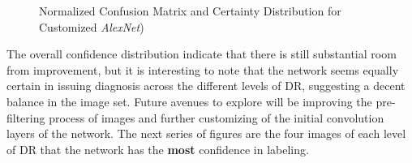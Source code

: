 \documentclass[letterpaper,12pt]{article}
\begin{document}
\begin{figure}[htbp]
\begin{center}
\caption{Normalized Confusion Matrix and Certainty Distribution for Customized \textit{AlexNet})}
\label{DR0_C}
\end{center}
\end{figure}

The overall confidence distribution indicate that there is still substantial room from improvement, but it is interesting to note that the network seems equally certain in issuing diagnosis across the different levels of DR, suggesting a decent balance in the image set. Future avenues to explore will be improving the pre-filtering process of images and further customizing of the initial convolution layers of the network. The next series of figures are the four images of each level of DR that the network has the \textbf{most} confidence in labeling.
\end{document}
